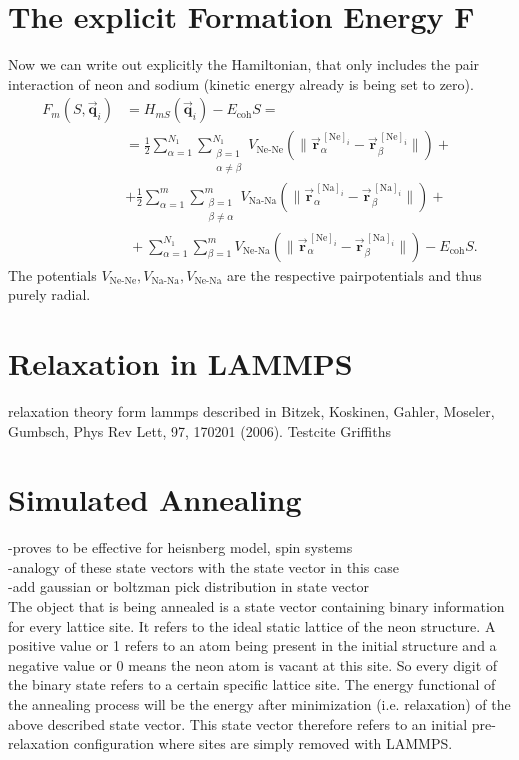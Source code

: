 \section{The explicit Formation Energy F}
Now we can write out explicitly the Hamiltonian, that only includes the pair interaction of neon and sodium (kinetic energy already is being set to zero).\begin{align}
	F_m(S,\vec{\mathbf{q}}_{i}) &= H_{mS}(\vec{\mathbf{q}}_{i}) - E_{\text{coh}} S=\\
	&=\frac{1}{2}\sum_{\alpha=1}^{N_1}\sum_{\substack{\beta=1\\\alpha\neq \beta}}^{N_1} V_{\text{Ne-Ne}}(\|\vec{\mathbf{r}}_\alpha^{\,[\text{Ne}]_i}-\vec{\mathbf{r}}_\beta^{\,[\text{Ne}]_i}\|)+\\&+
	\frac{1}{2}\sum_{\alpha=1}^{m}\sum_{\substack{\beta=1\\\beta\neq \alpha}}^{m} V_{\text{Na-Na}}(\|\vec{\mathbf{r}}_\alpha^{\,[\text{Na}]_i}-\vec{\mathbf{r}}_\beta^{\,[\text{Na}]_i}\|)+\\&\;+\sum_{\alpha=1}^{N_1}\sum_{\beta=1}^{m}V_{\text{Ne-Na}}(\|\vec{\mathbf{r}}_\alpha^{\,[\text{Ne}]_i}-\vec{\mathbf{r}}_\beta^{\,[\text{Na}]_i}\|)-E_\text{coh}S.
\end{align}
The potentials $V_\text{Ne-Ne},V_\text{Na-Na},V_\text{Ne-Na}$ are the respective pairpotentials and thus purely radial.
\section{Relaxation in LAMMPS}
relaxation theory form lammps 
described in \cite{Bitzek2006} Bitzek, Koskinen, Gahler, Moseler, Gumbsch, Phys Rev Lett, 97, 170201 (2006).
Testcite Griffiths\cite{griffithsQM}
 
\section{Simulated Annealing}
-proves to be effective for heisnberg model, spin systems\\
-analogy of these state vectors with the state vector in this case\\
-add gaussian or boltzman pick distribution in state vector\\
The object that is being annealed is a state vector containing binary information for every lattice site. It refers to the ideal static lattice of the neon structure. A positive value or 1 refers to an atom being present in the initial structure and a negative value or 0 means the neon atom is vacant at this site. So every digit of the binary state refers to a certain specific lattice site. The energy functional of the annealing process will be the energy after minimization (i.e. relaxation) of the above described state vector. This state vector therefore refers to an initial pre-relaxation configuration where sites are simply removed with \ac{LAMMPS}.

